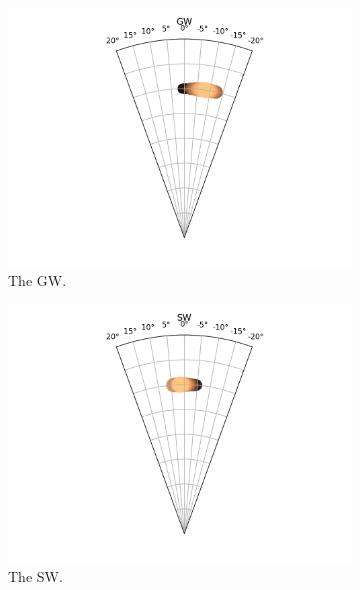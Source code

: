 \documentclass{kththesis}
\begin{document}
\begin{figure}
    \centering
    \begin{subfigure}{0.4\textwidth}
    \centering
    \includegraphics[width=\textwidth]{AgentDirectionChoices/MPDQN_Pebble_Direction_Choices_GW.png} 
    \caption{The GW.}
    \label{fig:GW_pebble_deviation}
    \end{subfigure}
    \begin{subfigure}{0.4\textwidth}
    \centering
    \includegraphics[width=\textwidth]{AgentDirectionChoices/MPDQN_Pebble_Direction_Choices_SW.png} 
    \caption{The SW.}
    \label{fig:SW_pebble_deviation}
    \end{subfigure}
    \begin{subfigure}{0.4\textwidth}

\end{subfigure}
\end{figure}
\end{document}
